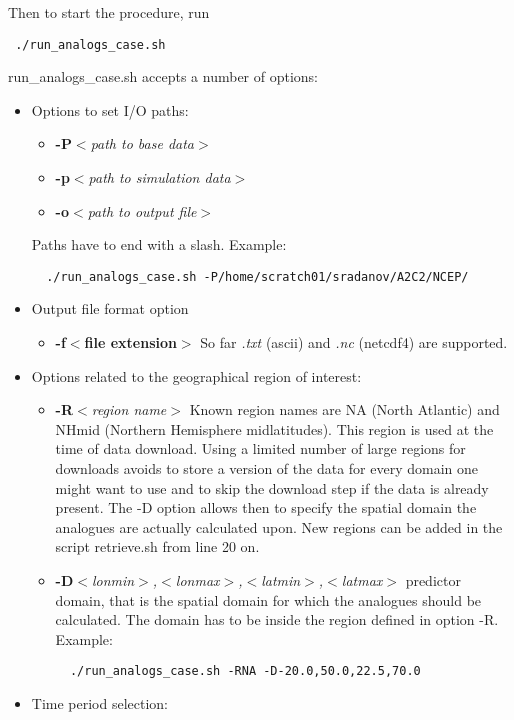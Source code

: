 \documentclass[11p,a4paper]{article}
\begin{document}
Then to start the procedure, run
\begin{verbatim}
 ./run_analogs_case.sh
\end{verbatim}
run\_analogs\_case.sh accepts a number of options:
\begin{itemize}
 \item Options to set I/O paths:
 \begin{itemize}
  \item \textbf{-P}\textit{$<$path to base data$>$}
  \item \textbf{-p}\textit{$<$path to simulation data$>$}
  \item \textbf{-o}\textit{$<$path to output file$>$}
 \end{itemize}
 Paths have to end with a slash.
 Example:
 \begin{verbatim}
  ./run_analogs_case.sh -P/home/scratch01/sradanov/A2C2/NCEP/
 \end{verbatim}
 \item Output file format option
 \begin{itemize}
  \item \textbf{-f}\textbf{$<$file extension$>$} So far \textit{.txt} (ascii) and  \textit{.nc} (netcdf4) are supported.
 \end{itemize}
 \item Options related to the geographical region of interest:
 \begin{itemize}
  \item \textbf{-R}\textit{$<$region name$>$} Known region names are NA (North Atlantic) and NHmid (Northern Hemisphere midlatitudes). This region is used at the time of data download. Using a limited number of large regions for downloads avoids to store a version of the data for every domain one might want to use and to skip the download step if the data is already present. The -D option allows then to specify the spatial domain the analogues are actually calculated upon. New regions can be added in the script retrieve.sh from line 20 on.
  \item \textbf{-D}\textit{$<$lonmin$>$,$<$lonmax$>$,$<$latmin$>$,$<$latmax$>$} predictor domain, that is the spatial domain for which the analogues should be calculated. The domain has to be inside the region defined in option -R. Example:
 \begin{verbatim}
  ./run_analogs_case.sh -RNA -D-20.0,50.0,22.5,70.0
 \end{verbatim}
 \end{itemize}
 \item Time period selection:

\end{itemize}
\end{document}
